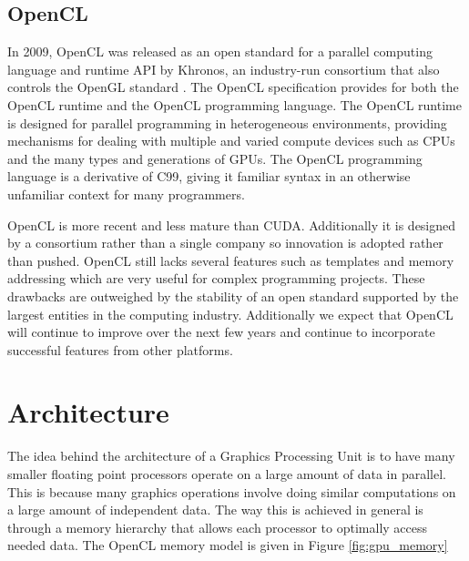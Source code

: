 \subsection{OpenCL}

In 2009, OpenCL was released as an open standard for a parallel computing
language and runtime API by Khronos, an industry-run consortium that also
controls the OpenGL standard \cite{OpenCL}. The OpenCL specification provides
for both the OpenCL runtime and the OpenCL programming language. The
OpenCL runtime is designed for parallel programming in heterogeneous
environments, providing mechanisms for dealing with multiple and varied compute
devices such as CPUs and the many types and generations of GPUs.  The OpenCL
programming language is a derivative of C99, giving it familiar syntax in an
otherwise unfamiliar context for many programmers.


OpenCL is more recent and less mature than CUDA. Additionally it is designed by
a consortium rather than a single company so innovation is adopted rather than
pushed. OpenCL still lacks several features such as templates and memory
addressing which are very useful for complex programming projects. These
drawbacks are outweighed by the stability of an open standard supported by the
largest entities in the computing industry. Additionally we expect that OpenCL
will continue to improve over the next few years and continue to incorporate
successful features from other platforms.



\section{Architecture}
The idea behind the architecture of a Graphics Processing Unit is to have many
smaller floating point processors operate on a large amount of data in
parallel. This is because many graphics operations involve doing similar
computations on a large amount of independent data.  The way this is achieved
in general is through a memory hierarchy that allows each processor to
optimally access needed data.  The OpenCL memory model is given in Figure
\ref{fig:gpu_memory}

